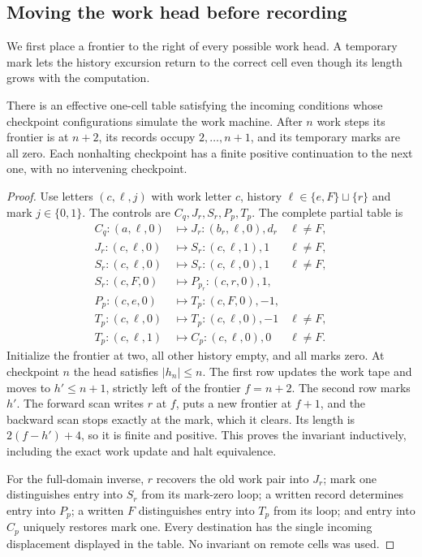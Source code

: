 \subsection{Moving the work head before recording}

We first place a frontier to the right of every possible work head.
A temporary mark lets the history excursion return to the correct
cell even though its length grows with the computation.

\begin{lemma}
\label{lem:bb-movefirst}\label{lem:bb-mid-right-compiler}
There is an effective one-cell table satisfying the incoming conditions
whose checkpoint configurations simulate the work machine.  After
$n$ work steps its frontier is at $n+2$, its records occupy
$2,\ldots,n+1$, and its temporary marks are all zero.  Each nonhalting
checkpoint has a finite positive continuation to the next one, with
no intervening checkpoint.
\end{lemma}
\begin{proof}
Use letters $(c,\ell,j)$ with work letter $c$, history
$\ell\in\{e,F\}\sqcup\{r\}$ and mark $j\in\{0,1\}$.
The controls are $C_q,J_r,S_r,P_p,T_p$.  The complete partial table is
\[
\begin{array}{lll}
 C_q:(a,\ell,0)&\mapsto J_r:(b_r,\ell,0),d_r&\ell\ne F,\\
 J_r:(c,\ell,0)&\mapsto S_r:(c,\ell,1),1&\ell\ne F,\\
 S_r:(c,\ell,0)&\mapsto S_r:(c,\ell,0),1&\ell\ne F,\\
 S_r:(c,F,0)&\mapsto P_{p_r}:(c,r,0),1,&\\
 P_p:(c,e,0)&\mapsto T_p:(c,F,0),-1,&\\
 T_p:(c,\ell,0)&\mapsto T_p:(c,\ell,0),-1&\ell\ne F,\\
 T_p:(c,\ell,1)&\mapsto C_p:(c,\ell,0),0&\ell\ne F.
\end{array}
\]
Initialize the frontier at two, all other history empty, and all marks
zero.  At checkpoint $n$ the head satisfies $|h_n|\le n$.
The first row updates the work tape and moves to $h'\le n+1$, strictly
left of the frontier $f=n+2$.  The second row marks $h'$.  The forward
scan writes $r$ at $f$, puts a new frontier at $f+1$, and the backward
scan stops exactly at the mark, which it clears.  Its length is
$2(f-h')+4$, so it is finite and positive.  This proves the invariant
inductively, including the exact work update and halt equivalence.

For the full-domain inverse, $r$ recovers the old work pair into $J_r$;
mark one distinguishes entry into $S_r$ from its mark-zero loop;
a written record determines entry into $P_p$; a written $F$
distinguishes entry into $T_p$ from its loop; and entry into $C_p$
uniquely restores mark one.  Every destination has the single incoming
displacement displayed in the table.  No invariant on remote cells
was used.
\end{proof}

